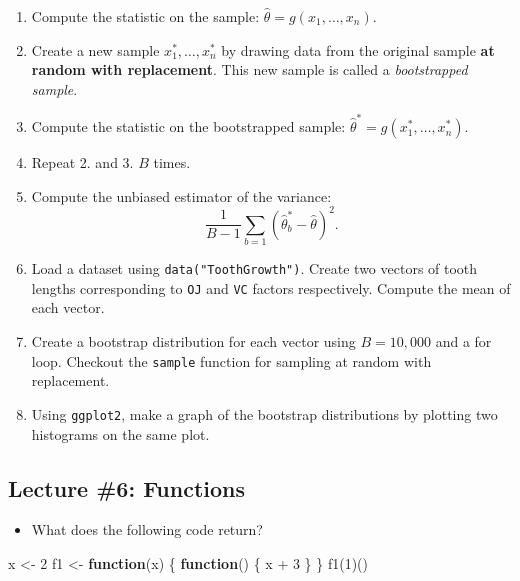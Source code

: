 \documentclass[
]{article}
\newenvironment{Shaded}{}{}
\newcommand{\ControlFlowTok}[1]{\textbf{#1}}
\newcommand{\DecValTok}[1]{#1}
\newcommand{\FunctionTok}[1]{#1}
\newcommand{\NormalTok}[1]{#1}
\newcommand{\OtherTok}[1]{#1}
\newcommand{\SpecialCharTok}[1]{#1}
\providecommand{\tightlist}{%
  \setlength{\itemsep}{0pt}\setlength{\parskip}{0pt}}
\begin{document}
\begin{enumerate}
\def\labelenumi{\arabic{enumi}.}
\item
  Compute the statistic on the sample:
  \(\hat{\theta} = g(x_1,\dots,x_n)\).
\item
  Create a new sample \(x_1^\ast,\dots,x_n^\ast\) by drawing data from
  the original sample \textbf{at random with replacement}. This new
  sample is called a \emph{bootstrapped sample}.
\item
  Compute the statistic on the bootstrapped sample:
  \(\hat{\theta}^\ast = g(x_1^\ast,\dots,x_n^\ast)\).
\item
  Repeat 2. and 3. \(B\) times.
\item
  Compute the unbiased estimator of the variance:
  \[\frac{1}{B-1}\sum_{b=1}(\hat{\theta}^\ast_{b}-\hat{\theta})^2.\]
\item
  Load a dataset using \texttt{data("ToothGrowth")}. Create two vectors
  of tooth lengths corresponding to \texttt{OJ} and \texttt{VC} factors
  respectively. Compute the mean of each vector.
\item
  Create a bootstrap distribution for each vector using \(B=10,000\) and
  a for loop. Checkout the \texttt{sample} function for sampling at
  random with replacement.
\item
  Using \texttt{ggplot2}, make a graph of the bootstrap distributions by
  plotting two histograms on the same plot.
\end{enumerate}

\hypertarget{lecture-6-functions}{%
\subsection{Lecture \#6: Functions}\label{lecture-6-functions}}

\begin{itemize}
\tightlist
\item
  What does the following code return?
\end{itemize}

\begin{Shaded}
\begin{Highlighting}[]
\NormalTok{x }\OtherTok{\textless{}{-}} \DecValTok{2}
\NormalTok{f1 }\OtherTok{\textless{}{-}} \ControlFlowTok{function}\NormalTok{(x) \{}
  \ControlFlowTok{function}\NormalTok{() \{}
\NormalTok{    x }\SpecialCharTok{+} \DecValTok{3}
\NormalTok{  \}}
\NormalTok{\}}
\FunctionTok{f1}\NormalTok{(}\DecValTok{1}\NormalTok{)()}
\end{Highlighting}
\end{Shaded}
\end{document}
